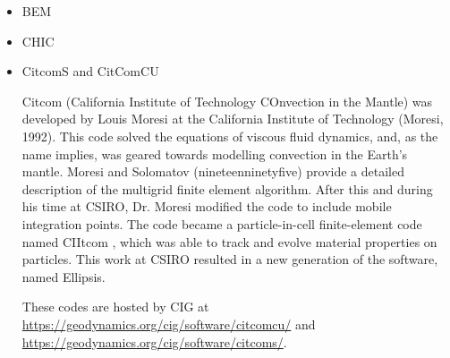 \begin{itemize}
\begin{scriptsize}
\cite{bokj08}
\cite{llor19}
\end{scriptsize}

\item {\codefont BEM}   

\begin{scriptsize}
\cite{crsr83}
\cite{katl95}
\cite{moct07}
\cite{moct09}
\cite{moyb10}
\cite{qumm12}\cite{buqm12}
\cite{quhm13}
\cite{gert19}
\end{scriptsize}

\item {\codefont CHIC}  

\begin{scriptsize}
\cite{norv15}
\end{scriptsize}

\item {\codefont CitcomS} and {\codefont CitComCU} 

Citcom (California Institute of Technology COnvection in the Mantle) was  developed by Louis
Moresi at the California Institute of Technology (Moresi, 1992). This code solved the equations
of viscous fluid dynamics, and, as the name implies, was geared towards modelling convection in
the Earth’s mantle. Moresi and Solomatov (nineteenninetyfive) provide a detailed description of the multigrid
finite element algorithm. After this and during his time at CSIRO, Dr. Moresi modified the code to
include mobile integration points. The code became a particle-in-cell finite-element code named
CIItcom , which was able to track and evolve material properties on particles. This work at
CSIRO resulted in a new generation of the software, named Ellipsis.

These codes are hosted by CIG at\\
\url{https://geodynamics.org/cig/software/citcomcu/} and \\
\url{https://geodynamics.org/cig/software/citcoms/}.


\end{itemize}
